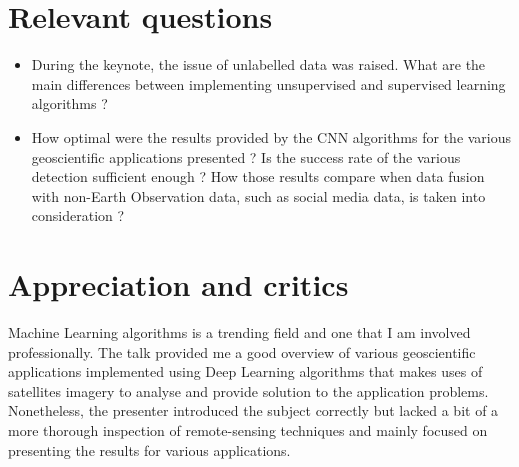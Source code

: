 \documentclass[11pt,a4paper]{article}
\begin{document}
\section{Relevant questions}

\begin{itemize}
  \item During the keynote, the issue of unlabelled data was raised. What are the main differences between implementing unsupervised and supervised learning algorithms ?
  \item How optimal were the results provided by the CNN algorithms for the various geoscientific applications presented ? Is the success rate of the various detection sufficient enough ? How those results compare when data fusion with non-Earth Observation data, such as social media data, is taken into consideration ?
\end{itemize}

\section{Appreciation and critics}

Machine Learning algorithms is a trending field and one that I am involved professionally. The talk provided me a good overview of various geoscientific applications implemented using Deep Learning algorithms that makes uses of satellites imagery to analyse and provide solution to the application problems. Nonetheless, the presenter introduced the subject correctly but lacked a bit of a more thorough inspection of remote-sensing techniques and mainly focused on presenting the results for various applications.

\end{document}
